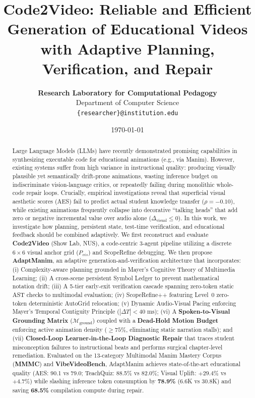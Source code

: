 \documentclass{article}
\title{\textbf{Code2Video: Reliable and Efficient Generation of Educational Videos with Adaptive Planning, Verification, and Repair}}
\author{
  \textbf{Research Laboratory for Computational Pedagogy} \\
  Department of Computer Science \\
  \texttt{\{researcher\}@institution.edu}
}
\date{\today}
\begin{document}
\maketitle

\begin{abstract}
Large Language Models (LLMs) have recently demonstrated promising capabilities in synthesizing executable code for educational animations (e.g., via Manim). However, existing systems suffer from high variance in instructional quality: producing visually plausible yet semantically drift-prone animations, wasting inference budget on indiscriminate vision-language critics, or repeatedly failing during monolithic whole-code repair loops. Crucially, empirical investigations reveal that superficial visual aesthetic scores (AES) fail to predict actual student knowledge transfer ($\rho = -0.10$), while existing animations frequently collapse into decorative ``talking heads'' that add zero or negative incremental value over audio alone ($\Delta_{\text{visual}} \le 0$). In this work, we investigate how planning, persistent state, test-time verification, and educational feedback should be combined adaptively. We first reconstruct and evaluate \textbf{Code2Video} (Show Lab, NUS), a code-centric 3-agent pipeline utilizing a discrete $6\times 6$ visual anchor grid ($P_{vis}$) and ScopeRefine debugging. We then propose \textbf{AdaptManim}, an adaptive generation-and-verification architecture that incorporates: (i) Complexity-aware planning grounded in Mayer's Cognitive Theory of Multimedia Learning; (ii) A cross-scene persistent Symbol Ledger to prevent mathematical notation drift; (iii) A 5-tier early-exit verification cascade spanning zero-token static AST checks to multimodal evaluation; (iv) ScopeRefine++ featuring Level~0 zero-token deterministic AutoGrid relocation; (v) Dynamic Audio-Visual Pacing enforcing Mayer's Temporal Contiguity Principle ($|\Delta T| < 40\text{ ms}$); (vi) A \textbf{Spoken-to-Visual Grounding Matrix} ($\mathcal{M}_{\text{ground}}$) coupled with a \textbf{Dead-Hold Motion Budget} enforcing active animation density ($\ge 75\%$, eliminating static narration stalls); and (vii) \textbf{Closed-Loop Learner-in-the-Loop Diagnostic Repair} that traces student misconception failures to instructional beats and performs surgical chapter-level remediation. Evaluated on the 13-category Multimodal Manim Mastery Corpus (\textbf{MMMC}) and \textbf{VibeVideoBench}, AdaptManim achieves state-of-the-art educational quality (AES: 90.1 vs 79.0; TeachQuiz: 88.5\% vs 82.0\%; Visual Uplift: $+29.4\%$ vs $+4.7\%$) while slashing inference token consumption by \textbf{78.9\%} (6.6K vs 30.8K) and saving \textbf{68.5\%} compilation compute during repair.
\end{abstract}
\end{document}
